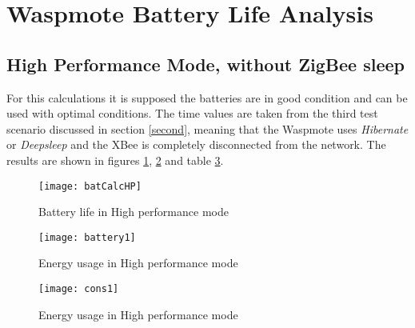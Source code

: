 \pagebreak
\section{Waspmote Battery Life Analysis}
\label{AppendixD} %
\subsection{High Performance Mode, without ZigBee sleep}
For this calculations it is supposed the batteries are in good condition and can be used with optimal conditions. The time values are taken from the third test scenario discussed in section \ref{second}, meaning that the Waspmote uses \textit{Hibernate} or \textit{Deepsleep} and the XBee is completely disconnected from the network.
The results are shown in figures \ref{fig:batCalcHP}, \ref{fig:batCalcHP1} and table \ref{fig:consump}.\\
\begin{figure}[htbp]
\centering
\texttt{[image: batCalcHP]}
\caption{Battery life in High performance mode}
\label{fig:batCalcHP}
\end{figure}
\begin{figure}[htbp]
\centering
\texttt{[image: battery1]}
\caption{Energy usage in High performance mode}
\label{fig:batCalcHP1}
\end{figure}
\begin{figure}[htbp]
\centering
\texttt{[image: cons1]}
\caption{Energy usage in High performance mode}
\label{fig:consump}
\end{figure}
\pagebreak
